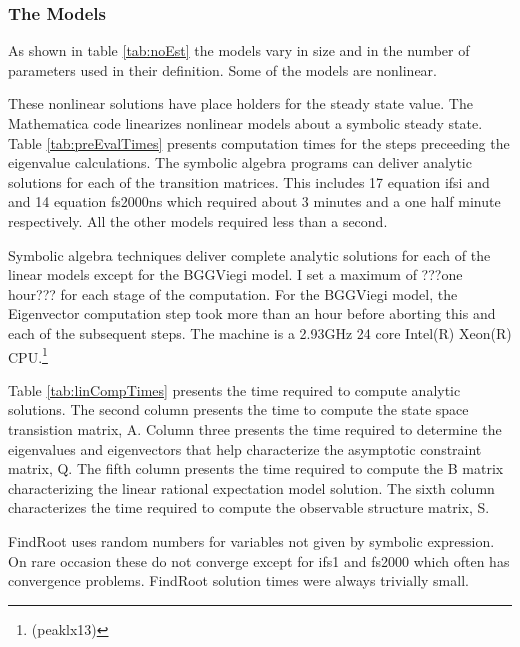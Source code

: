 \documentclass{beamer}
\begin{document}
  \begin{frame}

    \subsubsection{The Models }
As shown in table \ref{tab:noEst} the models vary in size and in the number of parameters used in their
definition. Some of the models are nonlinear.

%

  These nonlinear solutions have place holders for the steady state value.
The Mathematica code linearizes nonlinear models about a symbolic steady state.
Table \ref{tab:preEvalTimes} presents computation times for the steps
preceeding the eigenvalue calculations.
The symbolic algebra programs can deliver analytic solutions for
each of the transition matrices. This includes 17 equation ifsi and and 14 equation fs2000ns which required
about 3 minutes and a one half minute respectively. All the other models required less than a second.



%



Symbolic algebra techniques deliver complete 
analytic solutions for each of the linear
models except for the BGGViegi model. 
I set a maximum of ???one hour??? for each stage of the computation.
For the BGGViegi model, the Eigenvector computation 
step took more than an hour before aborting this and each of the subsequent 
steps.  
The machine is a 2.93GHz  24 core
Intel(R) Xeon(R) CPU.\footnote{(peaklx13)}

%

%

Table \ref{tab:linCompTimes} presents the time required to compute analytic 
solutions. 
The second column presents the time to compute the state space 
transistion matrix, A. Column three presents the time required to determine
the eigenvalues and eigenvectors that help characterize the asymptotic
constraint matrix, Q. The fifth column presents the time required to
compute the B matrix characterizing the linear rational expectation  model
solution.  The sixth column characterizes the time required to compute
the observable structure matrix, S.  

FindRoot uses random numbers for variables not given by symbolic expression.
On rare occasion these do not converge except for ifs1 and fs2000
 which often has convergence problems. 
FindRoot solution times were always trivially small.


\end{frame}
\end{document}
